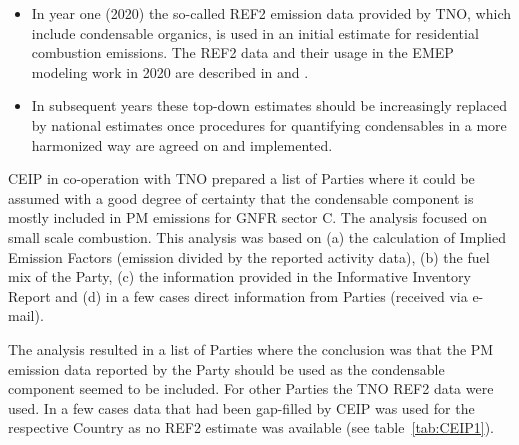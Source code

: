 \begin{itemize}
\item In year one (2020) the so-called REF2 emission data provided by TNO, which include condensable organics,  is used in an initial estimate for residential combustion emissions. The REF2 data and their usage in the EMEP modeling work in 2020 are described  in  \citet{R2020:CAMSREF2} and \citet{R2020:SVOC}. 
\item  In subsequent years these top-down estimates should be increasingly replaced by national estimates once procedures for quantifying condensables in a more harmonized way are agreed on and implemented.
\end{itemize}

CEIP in co-operation with TNO prepared a list of Parties where it could be assumed with a good degree of certainty that the condensable component is mostly included in PM emissions for GNFR sector C. The analysis focused on small scale combustion. This analysis was based on (a) the calculation of Implied Emission Factors (emission divided by the reported activity data), (b) the fuel mix of the Party, (c) the information provided in the Informative Inventory Report and (d) in a few cases direct information from Parties (received via e-mail).

The analysis resulted in a list of Parties where the conclusion was that the PM emission data reported by the Party should be used as the condensable component seemed to be included. For other Parties the TNO REF2 data were used. In a few cases data that had been gap-filled by CEIP was used for the respective Country as no REF2 estimate was available (see table~\ref{tab:CEIP1}).



